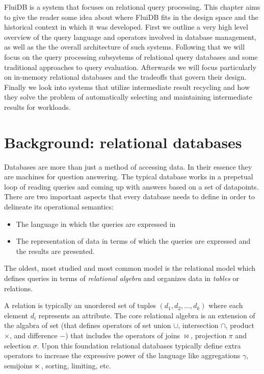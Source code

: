
FluiDB is a system that focuses on relational query processing. This
chapter aims to give the reader some idea about where FluiDB fits in
the design space and the historical context in which it was developed.
First we outline a very high level overview of the query language and
operators involved in database management, as well as the the overall
architecture of such systems. Following that we will focus on the
query processing subsystems of relational query databases and some
traditional approaches to query evaluation. Afterwards we will focus
particularly on in-memory relational databases and the tradeoffs that
govern their design. Finally we look into systems that utilize
intermediate result recycling and how they solve the problem of
automatically selecting and maintaining intermediate results for
workloads.

\section{Background: relational databases}
\label{sec:org5af5e27}
Databases are more than just a method of accessing data. In their
essence they are machines for question answering. The typical database
works in a prepetual loop of reading queries and coming up with
answers based on a set of datapoints. There are two important aspects
that every database needs to define in order to delineate its
operational semantics:

\begin{itemize}
\item The language in which the queries are expressed in
\item The representation of data in terms of which the queries are
expressed and the results are presented.
\end{itemize}

The oldest, most studied and most common model is the relational model
which defines queries in terms of \emph{relational algebra} and organizes
data in \emph{tables} or relations.

A relation is typically an unordered set of tuples
\((d_1,d_2,...,d_k)\) where each element \(d_i\) represents an
attribute. The core relational algebra is an extension of the algabra
of set (that defines operators of set union \(\cup\), intersection
\(\cap\), product \(\times\), and difference \(-\)) that includes the
operators of joins \(\Join\), projection \(\pi\) and selection
\(\sigma\). Upon this foundation relational databases typically define
extra operators to increase the expressive power of the language like
aggregations \(\gamma\), semijoins \(\ltimes\), sorting, limiting, etc.

